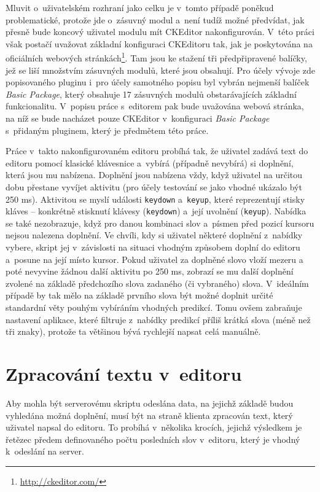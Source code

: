 \documentclass[a4paper,11pt,openany]{book} %
\begin{document}
Mluvit o~uživatelském rozhraní jako celku je v~tomto případě poněkud problematické, protože jde o~zásuvný modul a~není tudíž možné předvídat, jak přesně bude koncový uživatel modulu mít CKEditor nakonfigurován. V~této práci však postačí uvažovat základní konfiguraci CKEditoru tak, jak je poskytována na oficiálních webových stránkách\footnote{\url{http://ckeditor.com/}}. Tam jsou ke stažení tři předpřipravené balíčky, jež se liší množstvím zásuvných modulů, které jsou obsahují. Pro účely vývoje zde popisovaného pluginu i~pro účely samotného popisu byl vybrán nejmenší balíček {\it Basic Package}, který obsahuje 17 zásuvných modulů obstarávajících základní funkcionalitu. V~popisu práce s~editorem pak bude uvažována webová stránka, na níž se bude nacházet pouze CKEditor v~konfiguraci {\it Basic Package} s~přidaným pluginem, který je předmětem této práce.

Práce v~takto nakonfigurovaném editoru probíhá tak, že uživatel zadává text do editoru pomocí klasické klávesnice a~vybírá (případně nevybírá) si doplnění, která jsou mu nabízena. Doplnění jsou nabízena vždy, když uživatel na určitou dobu přestane vyvíjet aktivitu (pro účely testování se jako vhodné ukázalo být 250 ms). Aktivitou se myslí události {\tt keydown} a~{\tt keyup}, které reprezentují stisky kláves -- konkrétně stisknutí klávesy ({\tt keydown}) a~její uvolnění ({\tt keyup}). Nabídka se také nezobrazuje, když pro danou kombinaci slov a~písmen před pozicí kursoru nejsou nalezena doplnění. Ve chvíli, kdy si uživatel některé doplnění z~nabídky vybere, skript jej v~závislosti na situaci vhodným způsobem doplní do editoru a~posune na její místo kursor. Pokud uživatel za doplněné slovo vloží mezeru a poté nevyvine žádnou další aktivitu po 250 ms, zobrazí se mu další doplnění zvolené na základě předchozího slova zadaného (či vybraného) slova. V~ideálním případě by tak mělo na základě prvního slova být možné doplnit určité standardní věty pouhým vybíráním vhodných predikcí. Tomu ovšem zabraňuje nastavení aplikace, které filtruje z~nabídky predikcí příliš krátká slova (méně než tři znaky), protože ta většinou bývá rychlejší napsat celá manuálně.

\section{Zpracování textu v~editoru}

Aby mohla být serverovému skriptu odeslána data, na jejichž základě budou vyhledána možná doplnění, musí být na straně klienta zpracován text, který uživatel napsal do editoru. To probíhá v~několika krocích, jejichž výsledkem je řetězec předem definovaného počtu posledních slov v~editoru, který je vhodný k~odeslání na server.
\end{document}
